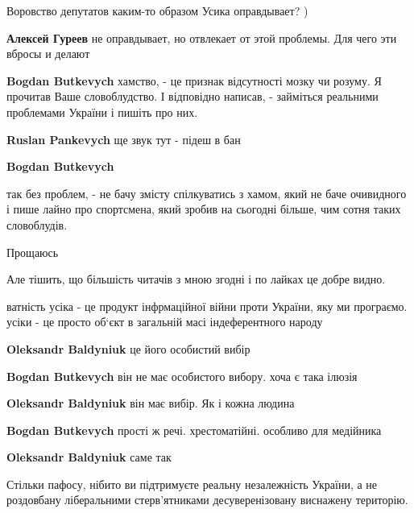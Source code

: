 \begin{itemize}
\begin{itemize}
Воровство депутатов каким-то образом Усика оправдывает? )

\textbf{Алексей Гуреев} не оправдывает, но отвлекает от этой проблемы. Для чего эти вбросы и делают

\textbf{Bogdan Butkevych} хамство, - це признак відсутності мозку чи розуму.
Я прочитав Ваше словоблудство. І відповідно написав, - займіться реальними проблемами України і пишіть про них.

\textbf{Ruslan Pankevych} ще звук тут - підеш в бан

\textbf{Bogdan Butkevych} 

так без проблем, - не бачу змісту спілкуватись з хамом, який не баче очивидного
і пише лайно про спортсмена, який зробив на сьогодні більше, чим сотня таких
словоблудів.

Прощаюсь

Але тішить, що більшість читачів з мною згодні і по лайках це добре видно.

\end{itemize} %


ватність усіка - це продукт інфрмаційної війни проти України, яку ми програємо.
усіки - це просто об‘єкт в загальній масі індеферентного народу

\begin{itemize} %
\textbf{Oleksandr Baldyniuk} це його особистий вибір

\textbf{Bogdan Butkevych} він не має особистого вибору. хоча є така ілюзія


\textbf{Oleksandr Baldyniuk} він має вибір. Як і кожна людина

\textbf{Bogdan Butkevych} прості ж речі. хрестоматійні. особливо для медійника


\textbf{Oleksandr Baldyniuk} саме так
\end{itemize} %


Стільки пафосу, нібито ви підтримуєте реальну незалежність України, а не
роздовбану ліберальними стерв'ятниками десуверенізовану виснажену територію.

\end{itemize} %
